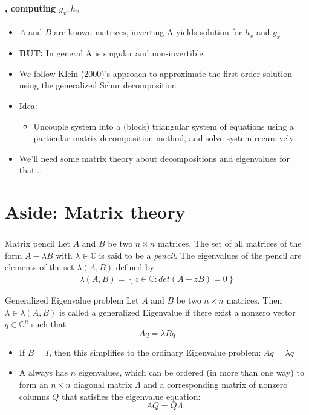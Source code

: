 \documentclass[handout]{beamer}  %
\begin{document}
\begin{frame}
\frametitle{\secname}\framesubtitle{\subsecname, computing $g_x,h_x$}
\begin{itemize}
\item $A$ and $B$ are known matrices, inverting A yields solution for $h_x$ and $g_x$
\item \textbf{BUT:} In general A is singular and non-invertible.
  \item We follow Klein (2000)'s approach to approximate the first order solution using the generalized Schur decomposition
  \item Idea:
  \begin{itemize}
      \item Uncouple system into a (block) triangular system of equations using a particular matrix decomposition method, and solve system recursively.
  \end{itemize}
\item We'll need some matrix theory about decompositions and eigenvalues for that...
\end{itemize}
\end{frame}

\section{Aside: Matrix theory}


\begin{frame}
\frametitle{\secname}\framesubtitle{}\footnotesize
\begin{block}{Matrix pencil}
  Let $A$ and $B$ be two $n\times n$ matrices. The set of all matrices of the form $A-\lambda B$ with $\lambda \in \mathbb{C}$ is said to be a \emph{pencil}. The eigenvalues of the pencil are elements of the set $\lambda(A,B)$ defined by
  \begin{align*}
    \lambda(A,B) =  \left\{z \in \mathbb{C}:det(A-zB)=0\right\}
  \end{align*}
\end{block}
\begin{block}{Generalized Eigenvalue problem}
  Let $A$ and $B$ be two $n\times n$ matrices. Then $\lambda \in \lambda(A,B)$ is called a generalized Eigenvalue if there exist a nonzero vector $q\in \mathbb{C}^n$ such that $$A q = \lambda B q$$
\end{block}
\begin{itemize}
\item If $B=I$, then this simplifies to the ordinary Eigenvalue problem: $A q = \lambda q$
\item A always has $n$ eigenvalues, which can be ordered (in more than one way) to form an $n\times n$ diagonal matrix $\Lambda$ and a corresponding matrix of nonzero columns $Q$ that satisfies the eigenvalue equation: $$AQ = Q\Lambda$$
\end{itemize}
\end{frame}
\end{document}
